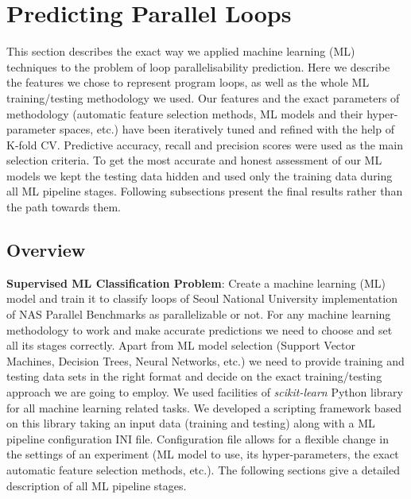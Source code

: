 \documentclass[sigconf,10pt,review,anonymous]{acmart}
\begin{document}
\section{Predicting Parallel Loops}
\label{predicting_parallel_loops}
\quad This section describes the exact way we applied machine learning (ML) techniques to the problem of loop parallelisability prediction. Here we describe the features we chose to represent program loops, as well as the whole ML training/testing methodology we used.\newline\null
\quad Our features and the exact parameters of methodology (automatic feature selection methods, ML models and their hyper-parameter spaces, etc.) have been iteratively tuned and refined with the help of K-fold CV. Predictive accuracy, recall and precision scores were used as the main selection criteria. To get the most accurate and honest assessment of our ML models we kept the testing data hidden and used only the training data during all ML pipeline stages. Following subsections present the final results rather than the path towards them.

\subsection{Overview}
\label{ml_overview}
\quad\textbf{Supervised ML Classification Problem}: Create a machine learning (ML) model and train it to classify loops of Seoul National University implementation \cite{snu-npb-benchmarks} of NAS Parallel Benchmarks \cite{nasa-parallel-benchmarks} as parallelizable or not.\newline\null 
\quad For any machine learning methodology to work and make accurate predictions we need to choose and set all its stages correctly. Apart from ML model selection (Support Vector Machines, Decision Trees, Neural Networks, etc.) we need to provide training and testing data sets in the right format and decide on the exact training/testing approach we are going to employ.\newline\null
\quad We used facilities of \textit{scikit-learn} \cite{scikit-learn} Python library for all machine learning related tasks. We developed a scripting framework based on this library taking an input data (training and testing) along with a ML pipeline configuration INI file. Configuration file allows for a flexible change in the settings of an experiment (ML model to use, its hyper-parameters, the exact automatic feature selection methods, etc.). The following sections give a detailed description of all ML pipeline stages.\newline\null
\end{document}
